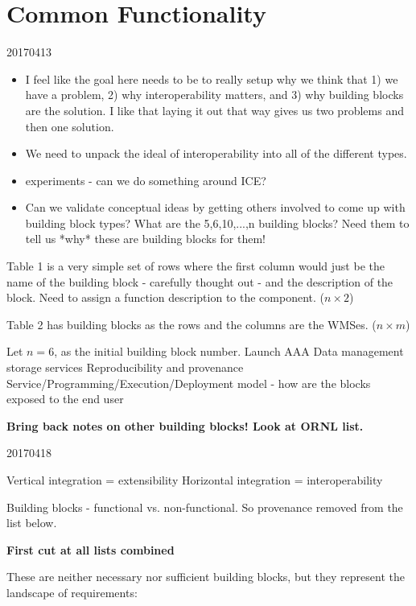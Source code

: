 \section{Common Functionality}\label{commonFunc}

20170413
\begin{itemize}
\item I feel like the goal here needs to be to really setup why we think that 1) we have a problem, 2) why interoperability matters, and 3) why building blocks are the solution. I like that laying it out that way gives us two problems and then one solution.
\item We need to unpack the ideal of interoperability into all of the different types.
\item experiments - can we do something around ICE?
\item Can we validate conceptual ideas by getting others involved to come up with building block types? What are the 5,6,10,...,n building blocks? Need them to tell us *why* these are building blocks for them!
\end{itemize}

Table 1 is a very simple set of rows where the first column would just be the name of the building block - carefully thought out - and the description of the block. Need to assign a function description to the component. ($n \times 2$)

Table 2 has building blocks as the rows and the columns are the WMSes. ($n \times m$)

Let $n = 6$, as the initial building block number.
Launch
AAA
Data management storage services
Reproducibility and provenance
Service/Programming/Execution/Deployment model - how are the blocks exposed to the end user

\textbf{Bring back notes on other building blocks! Look at ORNL list.}

20170418

Vertical integration = extensibility
Horizontal integration = interoperability

Building blocks - functional vs. non-functional. So provenance removed from the list below.

{\bf First cut at all lists combined}

These are neither necessary nor sufficient building blocks, but they represent the landscape of requirements:

